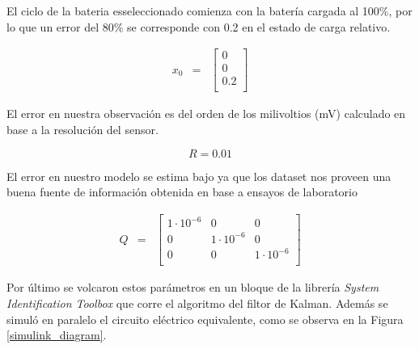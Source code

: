 \documentclass[10pt,a4paper]{article}
\begin{document}
    \noindent El ciclo de la bateria esseleccionado comienza con la batería 
    cargada al 100\%, por lo que un error del 80\% se corresponde con 0.2 en el 
    estado de carga relativo.

	\begin{equation}
		\begin{array}{llll}
			x_0 & = & \begin{bmatrix}
				0 \\
				0 \\
				0.2 \\
			\end{bmatrix} 
		\end{array} \nonumber
	\end{equation}

    \noindent El error en nuestra observación es del orden de los milivoltios
    (mV) calculado en base a la resolución del sensor.

	\begin{equation}
		R = 0.01  \nonumber
	\end{equation}
	
	\noindent El error en nuestro modelo se estima bajo ya que los dataset nos 
    proveen una buena fuente de información obtenida en base a ensayos de 
    laboratorio

	\begin{equation}
		\begin{array}{llll}
			Q & = & \begin{bmatrix}
				1\cdot10^{-6} & 0 & 0 \\
				0 & 1\cdot10^{-6} & 0 \\
				0 & 0 & 1\cdot10^{-6} \\
			\end{bmatrix} 
		\end{array} \nonumber
	\end{equation}
	
	Por último se volcaron estos parámetros en un bloque de la librería \emph{System Identification Toolbox} que corre el algoritmo del filtor de Kalman. Además se simuló en paralelo el circuito eléctrico equivalente, como se observa en la Figura \ref{simulink_diagram}.
\end{document}
